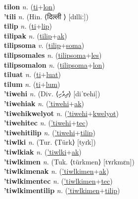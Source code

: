 \textbf{tilon} \textit{n.} (\hyperref[ti]{ti}+\hyperref[lon]{lon})
 \label{tilon} \\
\textbf{'tili} \textit{n.} (Hin. ⟨दिल्ली ⟩ [dɪlliː])
 \label{'tili} \\
\textbf{tilip} \textit{n.} (\hyperref[ti]{ti}+\hyperref[lip]{lip})
 \label{tilip} \\
\textbf{tilipak} \textit{n.} (\hyperref[tilip]{tilip}+\hyperref[ak]{ak})
 \label{tilipak} \\
\textbf{tilipsoma} \textit{v.} (\hyperref[tilip]{tilip}+\hyperref[soma]{soma})
 \label{tilipsoma} \\
\textbf{tilipsomales} \textit{n.} (\hyperref[tilipsoma]{tilipsoma}+\hyperref[les]{les})
 \label{tilipsomales} \\
\textbf{tilipsomalon} \textit{n.} (\hyperref[tilipsoma]{tilipsoma}+\hyperref[lon]{lon})
 \label{tilipsomalon} \\
\textbf{tiluat} \textit{n.} (\hyperref[ti]{ti}+\hyperref[luat]{luat})
 \label{tiluat} \\
\textbf{tilum} \textit{n.} (\hyperref[ti]{ti}+\hyperref[lum]{lum})
 \label{tilum} \\
\textbf{'tiwehi} \textit{n.} (Div. ⟨ދިވެހި⟩ [diˈʋehi])
 \label{'tiwehi} \\
\textbf{'tiwehiak} \textit{n.} (\hyperref['tiwehi]{'tiwehi}+\hyperref[ak]{ak})
 \label{'tiwehiak} \\
\textbf{'tiwehikwelyot} \textit{n.} (\hyperref['tiwehi]{'tiwehi}+\hyperref[kwelyot]{kwelyot})
 \label{'tiwehikwelyot} \\
\textbf{'tiwehitec} \textit{n.} (\hyperref['tiwehi]{'tiwehi}+\hyperref[tec]{tec})
 \label{'tiwehitec} \\
\textbf{'tiwehitilip} \textit{n.} (\hyperref['tiwehi]{'tiwehi}+\hyperref[tilip]{tilip})
 \label{'tiwehitilip} \\
\textbf{'tiwlki} \textit{n.} (Tur. ⟨Türk⟩ [tyɾk])
 \label{'tiwlki} \\
\textbf{'tiwlkiak} \textit{n.} (\hyperref['tiwlki]{'tiwlki}+\hyperref[ak]{ak})
 \label{'tiwlkiak} \\
\textbf{'tiwlkimen} \textit{n.} (Tuk. ⟨türkmen⟩ [tʏɾkmɛn])
 \label{'tiwlkimen} \\
\textbf{'tiwlkimenak} \textit{n.} (\hyperref['tiwlkimen]{'tiwlkimen}+\hyperref[ak]{ak})
 \label{'tiwlkimenak} \\
\textbf{'tiwlkimentec} \textit{n.} (\hyperref['tiwlkimen]{'tiwlkimen}+\hyperref[tec]{tec})
 \label{'tiwlkimentec} \\
\textbf{'tiwlkimentilip} \textit{n.} (\hyperref['tiwlkimen]{'tiwlkimen}+\hyperref[tilip]{tilip})
